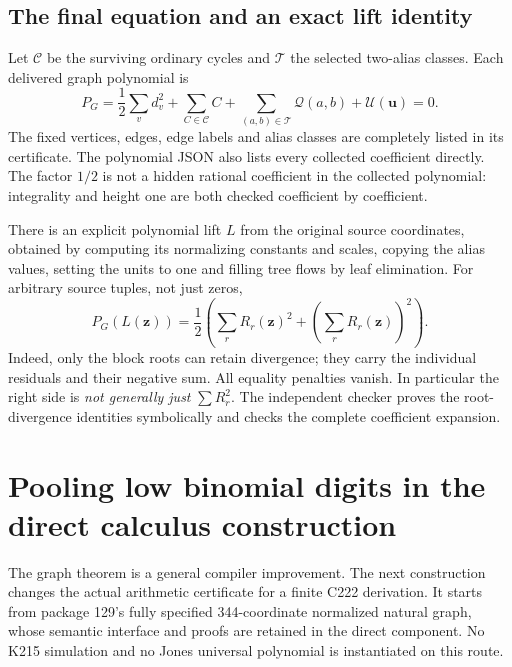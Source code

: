 \documentclass[11pt,letterpaper]{article}
\theoremstyle{definition}\newtheorem{definition}[theorem]{Definition}
\theoremstyle{remark}\newtheorem{remark}[theorem]{Remark}
\newcommand{\Qeq}{\mathcal Q}
\newcommand{\Ueq}{\mathcal U}
\begin{document}
\subsection{The final equation and an exact lift identity}

Let \(\mathcal C\) be the surviving ordinary cycles and \(\mathcal T\)
the selected two-alias classes. Each delivered graph polynomial is
\begin{equation}\label{eq:graph}
 \boxed{P_G=\frac12\sum_v d_v^2
             +\sum_{C\in\mathcal C}C
             +\sum_{(a,b)\in\mathcal T}\Qeq(a,b)
             +\Ueq(\mathbf u)=0.}
\end{equation}
The fixed vertices, edges, edge labels and alias classes are completely
listed in its certificate. The polynomial JSON also lists every
collected coefficient directly. The factor \(1/2\) is not a hidden
rational coefficient in the collected polynomial: integrality and
height one are both checked coefficient by coefficient.

There is an explicit polynomial lift \(L\) from the original source
coordinates, obtained by computing its normalizing constants and scales,
copying the alias values, setting the units to one and filling tree
flows by leaf elimination. For arbitrary source tuples, not just zeros,
\begin{equation}\label{eq:lift}
 P_G(L(\mathbf z))=
 \frac12\left(\sum_r R_r(\mathbf z)^2+
                    \left(\sum_rR_r(\mathbf z)\right)^2\right).
\end{equation}
Indeed, only the block roots can retain divergence; they carry the
individual residuals and their negative sum. All equality penalties
vanish. In particular the right side is \emph{not generally just}
\(\sum R_r^2\). The independent checker proves the root-divergence
identities symbolically and checks the complete coefficient expansion.

\section{Pooling low binomial digits in the direct calculus construction}
\label{sec:direct}

The graph theorem is a general compiler improvement. The next construction
changes the actual arithmetic certificate for a finite C222 derivation.
It starts from package 129's fully specified 344-coordinate normalized
natural graph, whose semantic interface and proofs are retained in the
direct component. No K215 simulation and no Jones universal polynomial
is instantiated on this route.
\end{document}
